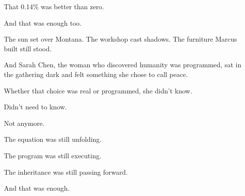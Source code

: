 That 0.14\% was better than zero.

And that was enough too.

The sun set over Montana. The workshop cast shadows. The furniture Marcus built still stood.

And Sarah Chen, the woman who discovered humanity was programmed, sat in the gathering dark and felt something she chose to call peace.

Whether that choice was real or programmed, she didn't know.

Didn't need to know.

Not anymore.

The equation was still unfolding.

The program was still executing.

The inheritance was still passing forward.

And that was enough.

